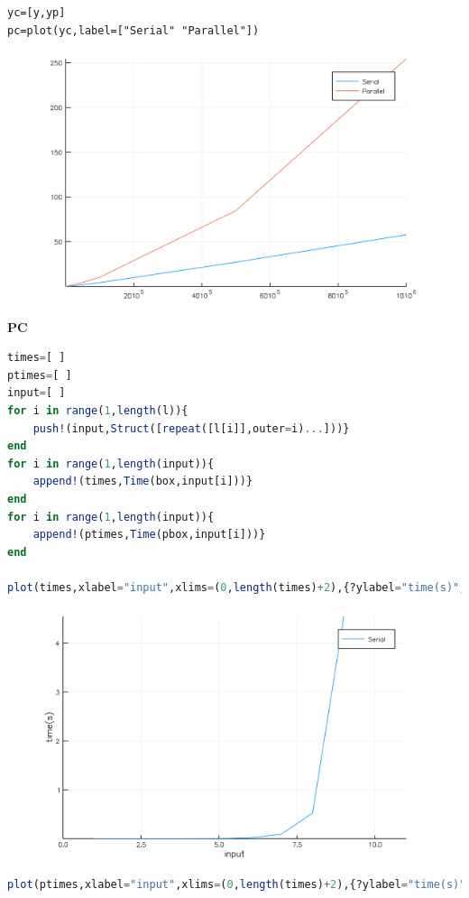 \documentclass[a4paper,12pt]{article}
\begin{document}
\begin{verbatim}
yc=[y,yp]
pc=plot(yc,label=["Serial" "Parallel"])
\end{verbatim}
\begin{figure}[ht!]
\centering
\includegraphics[width=11cm,scale=0.5]{compbox.png}
\end{figure}
\newpage
\textbf{PC}
\begin{lstlisting}[language=Julia,format=Julia]
times=[ ]
ptimes=[ ]
input=[ ]
for i in range(1,length(l)){
    push!(input,Struct([repeat([l[i]],outer=i)...]))}
end
for i in range(1,length(input)){
    append!(times,Time(box,input[i]))}
end
for i in range(1,length(input)){
    append!(ptimes,Time(pbox,input[i]))}
end

plot(times,xlabel="input",xlims=(0,length(times)+2),{?ylabel="time(s)",label=["Serial"])
\end{lstlisting}
\begin{figure}[ht!]
\centering
\includegraphics[width=11cm,scale=0.3]{boxSerial.png}
\end{figure}
\newpage
\begin{lstlisting}[language=Julia,format=Julia]
plot(ptimes,xlabel="input",xlims=(0,length(times)+2),{?ylabel="time(s)",label=["Parallel"])
\end{lstlisting}
\end{document}

